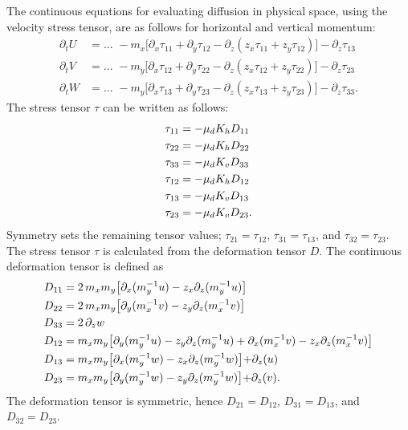 The continuous equations for evaluating diffusion in physical space,
using the velocity stress tensor, are as follows for
horizontal and vertical momentum:
%
\begin{align}
\partial_t U &= ...\,\,
- m_x \bigl[ \partial_x \tau_{11} + \partial_y \tau_{12} 
- \partial_z ( z_x \tau_{11} + z_y \tau_{12}) \bigr]
- \partial_z \tau_{13}
\label{u-disp-phys} \\
%
\partial_t V &= ...\,\,
- m_y \bigl[ \partial_x \tau_{12} + \partial_y \tau_{22} 
- \partial_z ( z_x \tau_{12} + z_y \tau_{22}) \bigr]
- \partial_z \tau_{23}
\label{v-disp-phys} \\
%
\partial_t W &= ...\,\,
- m_y \bigl[ \partial_x \tau_{13} + \partial_y \tau_{23} 
- \partial_z ( z_x \tau_{13} + z_y \tau_{23}) \bigr]
- \partial_z \tau_{33}.
\label{w-disp-phys}
\end{align}
%
The stress tensor $\tau$ can be written as follows:
%
\begin{align}
\tau_{11} &= -\mu_d K_h D_{11} 
\notag \\
%
\tau_{22} &= -\mu_d K_h D_{22} 
\notag \\
%
\tau_{33} &= -\mu_d K_v D_{33} 
\notag \\
%
\tau_{12} &= -\mu_d K_h D_{12} 
\notag \\
%
\tau_{13} &= -\mu_d K_v D_{13} 
\notag \\
%
\tau_{23} &= -\mu_d K_v D_{23}.
\notag 
%
\end{align}
%
\noindent
Symmetry sets the remaining tensor values;
$\tau_{21} = \tau_{12}$, $\tau_{31} = \tau_{13}$, and $\tau_{32} = \tau_{23}$.
The stress tensor $\tau$ is calculated from the deformation tensor
$D$.  The continuous deformation tensor is defined as
%
\begin{align}
D_{11} &= 2 \, m_x m_y \bigl[ \partial_x (m_y^{-1}u) - z_x \partial_z
(m_y^{-1}u) \bigl] 
\notag \\
%
D_{22} &= 2 \, m_x m_y \bigl[ \partial_y (m_x^{-1}v) - z_y \partial_z
(m_x^{-1}v) \bigl] 
\notag \\
%
D_{33} &= 2 \, \partial_z w
\notag \\
%
D_{12} &= m_x m_y \bigl[ 
\partial_y (m_y^{-1}u) - z_y \partial_z(m_y^{-1}u)
+ \partial_x (m_x^{-1}v) - z_x \partial_z (m_x^{-1}v)
\bigl] 
\notag \\
%
D_{13} &= m_x m_y \bigl[ 
\partial_x (m_y^{-1}w) - z_x \partial_z(m_y^{-1}w)
\bigl] 
+ \partial_z (u)
\notag \\
%
D_{23} &= m_x m_y \bigl[ 
\partial_y (m_y^{-1}w) - z_y \partial_z(m_y^{-1}w)
\bigl] 
+ \partial_z (v).
\notag 
%
\end{align}
%
\noindent
The deformation tensor is symmetric, hence 
$D_{21} = D_{12}$, $D_{31} = D_{13}$, and $D_{32} = D_{23}$.

